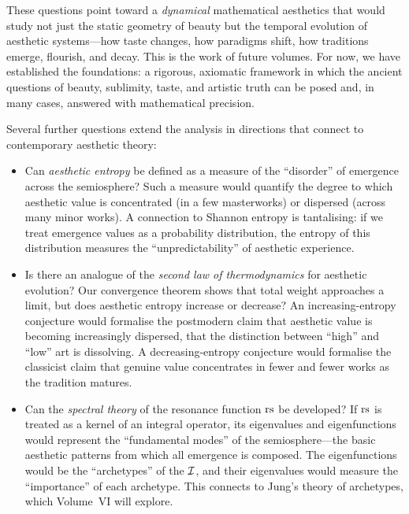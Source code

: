 These questions point toward a \emph{dynamical} mathematical aesthetics
that would study not just the static geometry of beauty but the temporal
evolution of aesthetic systems---how taste changes, how paradigms shift,
how traditions emerge, flourish, and decay.  This is the work of future
volumes.  For now, we have established the foundations: a rigorous,
axiomatic framework in which the ancient questions of beauty, sublimity,
taste, and artistic truth can be posed and, in many cases, answered with
mathematical precision.

Several further questions extend the analysis in directions that connect to contemporary aesthetic theory:

\begin{itemize}
\item Can \emph{aesthetic entropy} be defined as a measure of the ``disorder'' of emergence across the semiosphere?  Such a measure would quantify the degree to which aesthetic value is concentrated (in a few masterworks) or dispersed (across many minor works).  A connection to Shannon entropy is tantalising: if we treat emergence values as a probability distribution, the entropy of this distribution measures the ``unpredictability'' of aesthetic experience.

\item Is there an analogue of the \emph{second law of thermodynamics} for aesthetic evolution?  Our convergence theorem shows that total weight approaches a limit, but does aesthetic entropy increase or decrease?  An increasing-entropy conjecture would formalise the postmodern claim that aesthetic value is becoming increasingly dispersed, that the distinction between ``high'' and ``low'' art is dissolving.  A decreasing-entropy conjecture would formalise the classicist claim that genuine value concentrates in fewer and fewer works as the tradition matures.

\item Can the \emph{spectral theory} of the resonance function $\mathrm{rs}$ be developed?  If $\mathrm{rs}$ is treated as a kernel of an integral operator, its eigenvalues and eigenfunctions would represent the ``fundamental modes'' of the semiosphere---the basic aesthetic patterns from which all emergence is composed.  The eigenfunctions would be the ``archetypes'' of the $\mathcal{I}$, and their eigenvalues would measure the ``importance'' of each archetype.  This connects to Jung's theory of archetypes, which Volume~VI will explore.
\end{itemize}


